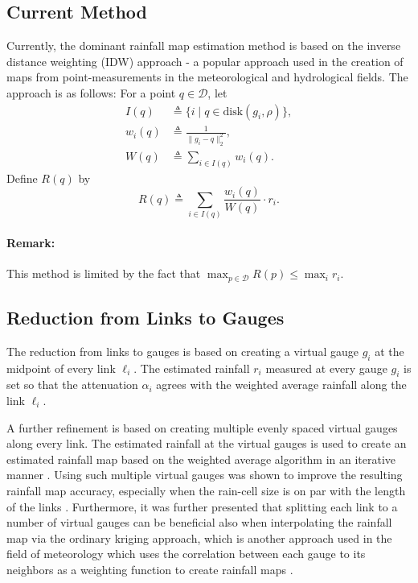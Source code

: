 \documentclass{article}
\newcommand{\disk}{\text{disk}}
\begin{document}
\subsection{Current Method}
Currently, the dominant rainfall map estimation method is based on the inverse distance weighting (IDW) approach - a popular approach used in the creation of maps from point-measurements in the meteorological and hydrological fields. The approach is as follows: For a point $q\in\mathcal{D}$, let
\begin{align}
I(q) &\triangleq \{i\mid q\in\disk(g_i,\rho)\}, \\
w_i(q) &\triangleq \frac{1}{\|g_i-q\|_2^2}, \\
W(q) &\triangleq \sum_{i \in I(q)} w_i(q).
\end{align}
Define $R(q)$ by
\begin{equation}
R(q) \triangleq \sum_{i\in I(q)} \frac{w_i(q)}{W(q)} \cdot r_i.
\end{equation}

\paragraph{Remark:} This method is limited by the fact that $\max_{p\in \mathcal{D}} R(p) \leq \max_i r_i$.


\subsection{Reduction from Links to Gauges}
The reduction from links to gauges is based on creating a virtual gauge $g_i$ at the midpoint of every link $\ell_i$. The estimated rainfall $r_i$ measured at every gauge $g_i$ is set so that the attenuation $\alpha_i$ agrees with the weighted average rainfall along the link $\ell_i$.

A further refinement is based on creating multiple evenly spaced virtual gauges along every link. The estimated rainfall at the virtual gauges is used to create an estimated rainfall map based on the weighted average algorithm in an iterative manner \cite{goldshtein2009rain}. Using such multiple virtual gauges was shown to improve the resulting rainfall map accuracy, especially when the rain-cell size is on par with the length of the links \cite{eshel2019spatial}. Furthermore, it was further presented that splitting each link to a number of virtual gauges can be beneficial also when interpolating the rainfall map via the ordinary kriging approach, which is another approach used in the field of meteorology which uses the correlation between each gauge to its neighbors as a weighting function to create rainfall maps \cite{cressie1990origins_krigorigin}. 
\end{document}
